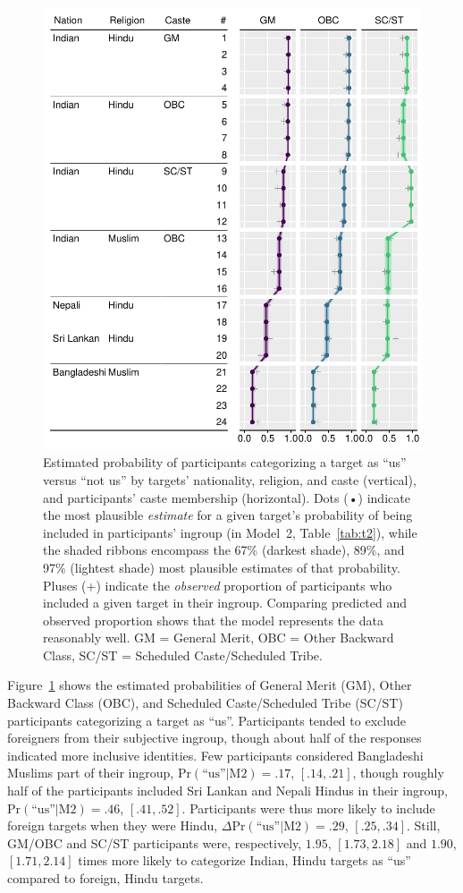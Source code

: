 \documentclass[12pt, a4paper]{article}
\newcommand{\pest}[4]{$ \text{Pr} (\text{``us''} | \text{#1}) = #2$, $[#3, #4]$}
\newcommand{\pdif}[4]{$ \Delta\text{Pr} (\text{``us''} | \text{#1}) = #2$, $[#3, #4]$}
\begin{document}
\begin{figure}
\centering
\includegraphics[scale=1]{../figures/figure-3}
\caption{
Estimated probability of participants categorizing a target as ``us'' versus ``not us'' by targets' nationality, religion, and caste (vertical), and participants' caste membership (horizontal). Dots (•) indicate the most plausible \emph{estimate} for a given target's probability of being included in participants' ingroup (in Model~2, Table~\ref{tab:t2}), while the shaded ribbons encompass the 67\% (darkest shade), 89\%, and 97\% (lightest shade) most plausible estimates of that probability. Pluses (+) indicate the \emph{observed} proportion of participants who included a given target in their ingroup. Comparing predicted and observed proportion shows that the model represents the data reasonably well. GM = General Merit, OBC = Other Backward Class, SC/ST = Scheduled Caste/Scheduled Tribe.
}
\label{fig:f3}
\end{figure}

Figure~\ref{fig:f3} shows the estimated probabilities of General Merit (GM), Other Backward Class (OBC), and Scheduled Caste/Scheduled Tribe (SC/ST) participants categorizing a target as ``us''. Participants tended to exclude foreigners from their subjective ingroup, though about half of the responses indicated more inclusive identities. Few participants considered Bangladeshi Muslims part of their ingroup, \pest{M2}{.17}{.14}{.21}, though roughly half of the participants included Sri Lankan and Nepali Hindus in their ingroup, \pest{M2}{.46}{.41}{.52}. Participants were thus more likely to include foreign targets when they were Hindu, \pdif{M2}{.29}{.25}{.34}. Still, GM/OBC and SC/ST participants were, respectively, $1.95$, $[1.73, 2.18]$ and $1.90$, $[1.71, 2.14]$ times more likely to categorize Indian, Hindu targets as ``us'' compared to foreign, Hindu targets.
\end{document}
